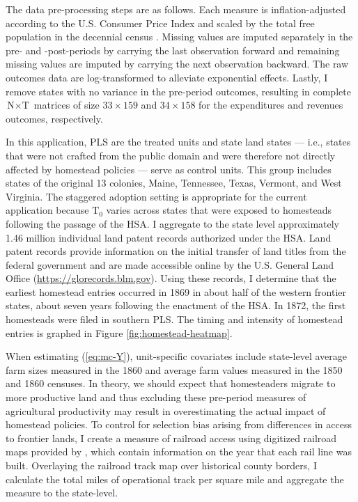 The data pre-processing steps are as follows. Each measure is inflation-adjusted according to the U.S. Consumer Price Index \citep{williamson2017seven} and scaled by the total free population in the decennial census \citep{haines2010}. Missing values are imputed separately in the pre- and -post-periods by carrying the last observation forward and remaining missing values are imputed by carrying the next observation backward. The raw outcomes data are log-transformed to alleviate exponential effects. Lastly, I remove states with no variance in the pre-period outcomes, resulting in complete $\text{N} \times \text{T}$ matrices of size $33 \times 159$ and $34 \times 158$ for the expenditures and revenues outcomes, respectively. 

In this application, PLS are the treated units and state land states --- i.e., states that were not crafted from the public domain and were therefore not directly affected by homestead policies --- serve as control units. This group includes states of the original 13 colonies, Maine, Tennessee, Texas, Vermont, and West Virginia. The staggered adoption setting is appropriate for the current application because $\text{T}_0$ varies across states that were exposed to homesteads following the passage of the HSA. I aggregate to the state level approximately 1.46 million individual land patent records authorized under the HSA. Land patent records provide information on the initial transfer of land titles from the federal government and are made accessible online by the U.S. General Land Office (\url{https://glorecords.blm.gov}). Using these records, I determine that the earliest homestead entries occurred in 1869 in about half of the western frontier states, about seven years following the enactment of the HSA. In 1872, the first homesteads were filed in southern PLS. The timing and intensity of homestead entries is graphed in Figure \ref{fig:homestead-heatmap}. 

When estimating (\ref{eq:mc-Y}), unit-specific covariates include state-level average farm sizes measured in the 1860 and average farm values measured in the 1850 and 1860 censuses. In theory, we should expect that homesteaders migrate to more productive land and thus excluding these pre-period measures of agricultural productivity may result in overestimating the actual impact of homestead policies. To control for selection bias arising from differences in access to frontier lands, I create a measure of railroad access using digitized railroad maps provided by \citet{atack2013use}, which contain information on the year that each rail line was built. Overlaying the railroad track map over historical county borders, I calculate the total miles of operational track per square mile and aggregate the measure to the state-level.

